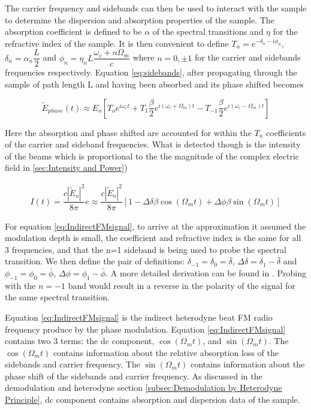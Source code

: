 \documentclass[11pt,a4paper]{book}
\begin{document}
		The carrier frequency and sidebands can then be used to interact with the sample to determine the dispersion and absorption properties of the sample. The absorption coefficient is defined to be $\alpha$ of the spectral transitions and $\eta$ for the refractive index of the sample. It is then convenient to define $T_n=e^{-\delta_n -i \phi_n}$, $\delta_n=\alpha_n \dfrac{L}{2}$ and $\phi_n=\eta_n L\dfrac{\omega_c + n\Omega_m}{c}$ where $n=0,\pm1$ for the carrier and sidebands frequencies respectively. Equation \autoref{eq:sidebands}, after propagating through the sample of path length L and having been absorbed and its phase shifted becomes
		
		\begin{equation}
			\tilde{E}_{phase}(t)\approx E_o [T_o e^{i\omega_c t}   +   T_1 \dfrac{\beta}{2} e^{i(\omega_c +\Omega_m)t}  -  T_{-1} \dfrac{\beta}{2} e^{i(\omega_c -\Omega_m)t}]
		\end{equation}
		
		Here the absorption and phase shifted are accounted for within the $T_n$ coefficients of the carrier and sideband frequencies. What is detected though is the intensity of the beams which is proportional to the the magnitude of the complex electric field in \autoref{sec:Intensity and Power})
		
		\begin{equation}
			\label{eq:IndirectFMsignal}
			\begin{split}
			I(t) = \dfrac{c|\tilde{E}_o|^2}{8\pi} e \approx \dfrac{c|\tilde{E}_o|^2}{8\pi}[1-\Delta\delta\beta \cos{(\Omega_m t)+\Delta\phi\beta\sin{(\Omega_m t)}}]
			\end{split}
		\end{equation}
		
		For equation \autoref{eq:IndirectFMsignal}, to arrive at the approximation it assumed the modulation depth is small, the coefficient and refractive index is the same for all 3 frequencies, and that the n=1 sideband is being used to probe the spectral transition. We then define the pair of definitions: $\delta_{-1}=\delta_0=\bar{\delta}$, $\Delta\delta = \delta_1 -\bar{\delta}$ and $\phi_{-1}=\phi_0=\bar{\phi}$, $\Delta\phi = \phi_1 -\bar{\phi}$. A more detailed derivation can be found in \cite{FMspec}. Probing with the $n=-1$ band would result in a reverse in the polarity of the signal for the same spectral transition.
		
		Equation \autoref{eq:IndirectFMsignal} is the indirect heterodyne beat FM radio frequency produce by the phase modulation. Equation \autoref{eq:IndirectFMsignal} contains two 3 terms: the dc component, $\cos{(\Omega_m t)}$, and $\sin{(\Omega_m t)}$. The $\cos{(\Omega_m t)}$ contains information about the relative absorption loss of the sidebands and carrier frequency. The $\sin{(\Omega_m t)}$ contains information about the phase shift of the sidebands and carrier frequency. As discussed in the demodulation and heterodyne section \autoref{subsec:Demodulation by Heterodyne Principle}, dc component contains absorption and dispersion data of the sample.
		
\end{document}
